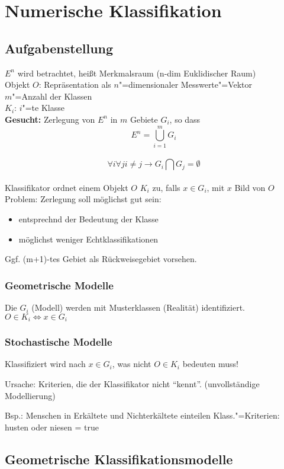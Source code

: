 \documentclass[a4paper,12pt]{scrreprt}
\newcommand{\Nb}[1]{\textbf{#1}}
\begin{document}
\chapter{Numerische Klassifikation}
\label{NumerischeKlassifikation}
\section{Aufgabenstellung}
$E^n$ wird betrachtet, heißt Merkmalsraum (n-dim Euklidischer Raum)\\
Objekt $O$: Repräsentation als $n$"=dimensionaler Messwerte"=Vektor\\
$m$"=Anzahl der Klassen\\
$K_i$:  $i$"=te Klasse\\

\Nb{Gesucht:} Zerlegung von $E^n$ in $m$ Gebiete $G_i$, so dass
$$E^n=\bigcup\limits_{i=1}^{m} G_i $$ \\
$$ \forall i \forall j i\not=j \rightarrow G_i\bigcap G_j=\emptyset $$\\
Klassifikator ordnet einem Objekt $O$ $K_i$ zu, falls $x\in G_i$, mit
$x$ Bild von $O$
Problem: Zerlegung soll möglichst gut sein:
\begin{itemize}
 \item entsprechnd der Bedeutung der Klasse
 \item möglichst weniger Echtklassifikationen
\end{itemize}
Ggf. (m+1)-tes Gebiet als Rückweisegebiet vorsehen. 

\subsection{Geometrische Modelle}
Die $G_i$ (Modell) werden mit Musterklassen (Realität) identifiziert. $O\in K_i
\Leftrightarrow x\in G_i$
\subsection{Stochastische Modelle}
Klassifiziert wird nach $x\in G_i$, was nicht $O\in K_i$ bedeuten
muss!

Ursache: Kriterien, die der Klassifikator nicht ``kennt''. (unvollständige Modellierung)

Bsp.: Menschen in Erkältete und Nichterkältete einteilen
Klass."=Kriterien:  husten oder niesen = true
\section{Geometrische Klassifikationsmodelle}
\end{document}
